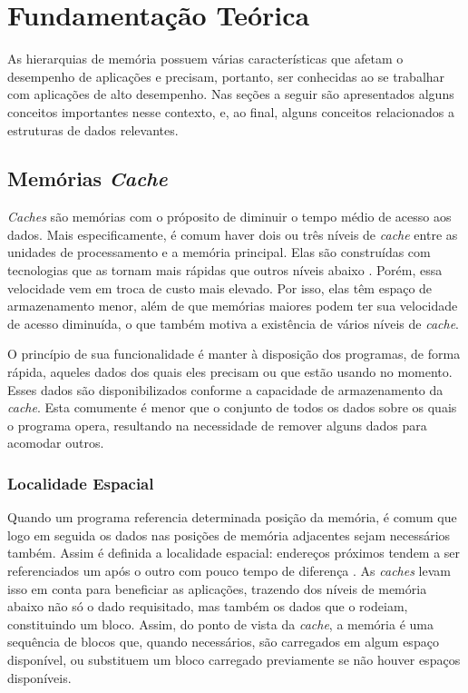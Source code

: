 \chapter{Fundamentação Teórica}
\label{cap:fundamentacao_teorica}
\acresetall


As hierarquias de memória possuem várias características que afetam o desempenho de aplicações e precisam, portanto, ser conhecidas ao se trabalhar com aplicações de alto desempenho.
Nas seções a seguir são apresentados alguns conceitos importantes nesse contexto, e, ao final, alguns conceitos relacionados a estruturas de dados relevantes.



\section{Memórias \textit{Cache}}
\label{sec:memorias_cache}

\textit{Caches} são memórias com o próposito de diminuir o tempo médio de acesso aos dados. Mais especificamente, é comum haver dois ou três níveis de \textit{cache} entre as unidades de processamento e a memória principal. Elas são construídas com tecnologias que as tornam mais rápidas que outros níveis abaixo \cite{Patterson}. Porém, essa velocidade vem em troca de custo mais elevado. Por isso, elas têm espaço de armazenamento menor, além de que memórias maiores podem ter sua velocidade de acesso diminuída, o que também motiva a existência de vários níveis de \textit{cache}.

O princípio de sua funcionalidade é manter à disposição dos programas, de forma rápida, aqueles dados dos quais eles precisam ou que estão usando no momento. Esses dados são disponibilizados conforme a capacidade de armazenamento da \textit{cache}. Esta comumente é menor que o conjunto de todos os dados sobre os quais o programa opera, resultando na necessidade de remover alguns dados para acomodar outros.

\subsection{Localidade Espacial}
\label{subsec:localidade_espacial}

Quando um programa referencia determinada posição da memória, é comum que logo em seguida os dados nas posições de memória adjacentes sejam necessários também. Assim é definida a localidade espacial: endereços próximos tendem a ser referenciados um após o outro com pouco tempo de diferença \cite{Patterson}. As \textit{caches} levam isso em conta para beneficiar as aplicações, trazendo dos níveis de memória abaixo não só o dado requisitado, mas também os dados que o rodeiam, constituindo um bloco. Assim, do ponto de vista da \textit{cache}, a memória é uma sequência de blocos que, quando necessários, são carregados em algum espaço disponível, ou substituem um bloco carregado previamente se não houver espaços disponíveis.

